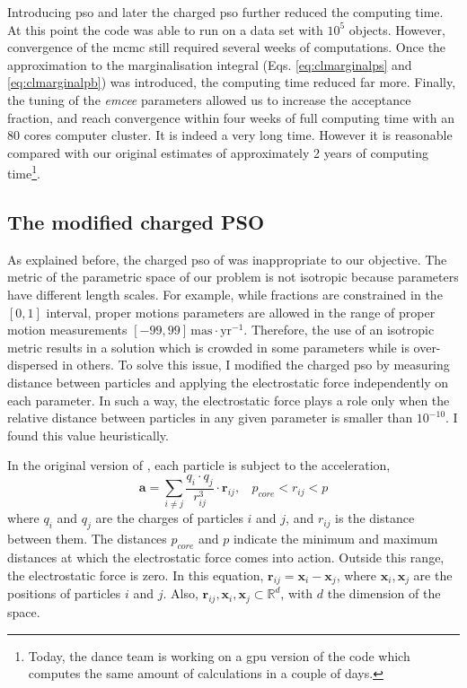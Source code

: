 Introducing \gls{pso} and later the charged \gls{pso} further reduced the computing time.  At this point the code was able to run on a data set with $10^5$ objects. However, convergence of the \gls{mcmc} still required several weeks of computations. Once the approximation to the marginalisation integral (Eqs. \ref{eq:clmarginalps} and \ref{eq:clmarginalpb}) was introduced, the computing time reduced far more. Finally, the tuning of the \emph{emcee} parameters allowed us to increase the acceptance fraction, and reach convergence within four weeks of full computing time with an 80 cores computer cluster. It is indeed a very long time. However it is reasonable compared with our original estimates of approximately 2 years of computing time\footnote{Today, the \gls{dance} team is working on a \gls{gpu} version of the code which computes the same amount of calculations in a couple of days.}.

\subsection{The modified charged PSO}
\label{sect:chargedPSO}
As explained before, the charged \gls{pso} of \citet{Blackwell2002} was inappropriate to our objective. The metric of the parametric space of our problem is not isotropic because parameters have different length scales. For example, while fractions are constrained in the $[0,1]$ interval, proper motions parameters are allowed in the range of proper motion measurements $[-99,99]\,\mathrm{mas\cdot yr^{-1}}$. Therefore, the use of an isotropic metric results in a solution which is crowded in some parameters while is over-dispersed in others. 
To solve this issue, I modified the charged \gls{pso} by measuring distance between particles and applying the electrostatic force independently on each parameter. In such a way, the electrostatic force plays a role only when the relative distance between particles in any given parameter is smaller than $10^{-10}$. I found this value heuristically.

In the original version of  \citet{Blackwell2002}, each particle is subject to the acceleration,
\begin{equation}
\label{eq:PSOacc}
\mathbf{a}=\sum_{i\neq j} \frac{q_i \cdot q_j }{r_{ij}^3} \cdot \mathbf{r}_{ij}, \ \ \ \ p_{core} < r_{ij} < p
\end{equation}
where $q_i$ and $q_j$ are the charges of particles $i$ and $j$, and $r_{ij}$ is the distance between them. The distances $p_{core}$ and $p$ indicate the minimum and maximum distances at which the electrostatic force comes into action. Outside this range, the electrostatic force is zero. In this equation, $\mathbf{r}_{ij}= \mathbf{x}_i -\mathbf{x}_j$, where $\mathbf{x}_i,\mathbf{x}_j$ are the positions of particles $i$ and $j$. Also, $\mathbf{r}_{ij},\mathbf{x}_i,\mathbf{x}_j \subset \mathbb{R}^d$, with $d$ the dimension of the space. 

